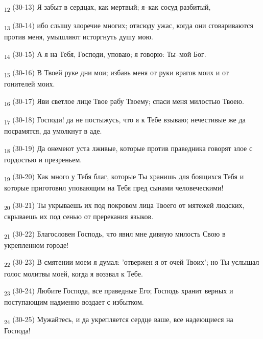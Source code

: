 \begin{tcolorbox}
\textsubscript{12} (30-13) Я забыт в сердцах, как мертвый; я--как сосуд разбитый,
\end{tcolorbox}
\begin{tcolorbox}
\textsubscript{13} (30-14) ибо слышу злоречие многих; отвсюду ужас, когда они сговариваются против меня, умышляют исторгнуть душу мою.
\end{tcolorbox}
\begin{tcolorbox}
\textsubscript{14} (30-15) А я на Тебя, Господи, уповаю; я говорю: Ты--мой Бог.
\end{tcolorbox}
\begin{tcolorbox}
\textsubscript{15} (30-16) В Твоей руке дни мои; избавь меня от руки врагов моих и от гонителей моих.
\end{tcolorbox}
\begin{tcolorbox}
\textsubscript{16} (30-17) Яви светлое лице Твое рабу Твоему; спаси меня милостью Твоею.
\end{tcolorbox}
\begin{tcolorbox}
\textsubscript{17} (30-18) Господи! да не постыжусь, что я к Тебе взываю; нечестивые же да посрамятся, да умолкнут в аде.
\end{tcolorbox}
\begin{tcolorbox}
\textsubscript{18} (30-19) Да онемеют уста лживые, которые против праведника говорят злое с гордостью и презреньем.
\end{tcolorbox}
\begin{tcolorbox}
\textsubscript{19} (30-20) Как много у Тебя благ, которые Ты хранишь для боящихся Тебя и которые приготовил уповающим на Тебя пред сынами человеческими!
\end{tcolorbox}
\begin{tcolorbox}
\textsubscript{20} (30-21) Ты укрываешь их под покровом лица Твоего от мятежей людских, скрываешь их под сенью от пререкания языков.
\end{tcolorbox}
\begin{tcolorbox}
\textsubscript{21} (30-22) Благословен Господь, что явил мне дивную милость Свою в укрепленном городе!
\end{tcolorbox}
\begin{tcolorbox}
\textsubscript{22} (30-23) В смятении моем я думал: 'отвержен я от очей Твоих'; но Ты услышал голос молитвы моей, когда я воззвал к Тебе.
\end{tcolorbox}
\begin{tcolorbox}
\textsubscript{23} (30-24) Любите Господа, все праведные Его; Господь хранит верных и поступающим надменно воздает с избытком.
\end{tcolorbox}
\begin{tcolorbox}
\textsubscript{24} (30-25) Мужайтесь, и да укрепляется сердце ваше, все надеющиеся на Господа!
\end{tcolorbox}
